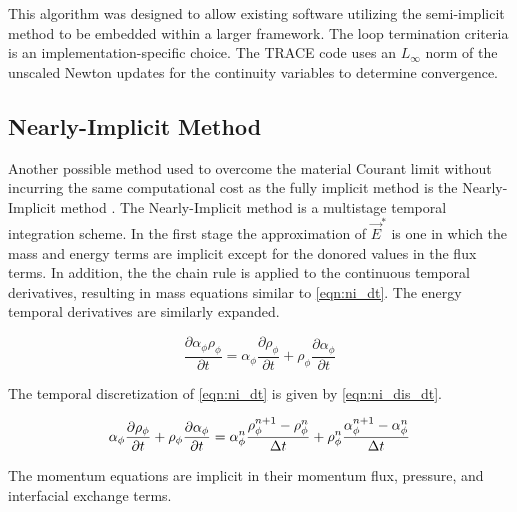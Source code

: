 This algorithm was designed to allow existing software utilizing the semi-implicit method to be embedded within a larger framework.
The loop termination criteria is an implementation-specific choice.
The TRACE code uses an $L_{\infty}$ norm of the unscaled Newton updates for the continuity variables to determine convergence.

\subsection{Nearly-Implicit Method}
\label{subsect:numerics_nearly_implicit}
Another possible method used to overcome the material Courant limit without incurring the same computational cost as the fully implicit method is the Nearly-Implicit method \cite{Trapp1986, RELAP}.
The Nearly-Implicit method is a multistage temporal integration scheme.
In the first stage the approximation  of $\vec{E}^{*}$ is one in which the mass and energy terms are implicit except for the donored values in the flux terms. 
In addition, the the chain rule is applied to the continuous temporal derivatives, resulting in mass equations similar to \eqref{eqn:ni_dt}.
The energy temporal derivatives are similarly expanded.

\begin{equation}
\label{eqn:ni_dt}
\frac{\partial \alpha_{\phi} \rho_{\phi}}{\partial t} = \alpha_{\phi} \frac{\partial \rho_{\phi}}{\partial t} + \rho_{\phi} \frac{\partial \alpha_{\phi}}{\partial t}
\end{equation}

The temporal discretization of \eqref{eqn:ni_dt} is given by \eqref{eqn:ni_dis_dt}.

\begin{equation}
\label{eqn:ni_dis_dt}
\alpha_{\phi} \frac{\partial \rho_{\phi}}{\partial t} + \rho_{\phi} \frac{\partial \alpha_{\phi}}{\partial t} = \alpha^{n}_{\phi} \frac{ \rho^{n+1}_{\phi} - \rho^{n}_{\phi}}{\dt{}} + \rho^{n}_{\phi} \frac{\alpha^{n+1}_{\phi} - \alpha^{n}_{\phi} }{\dt}
\end{equation}

The momentum equations are implicit in their momentum flux, pressure, and interfacial exchange terms.

